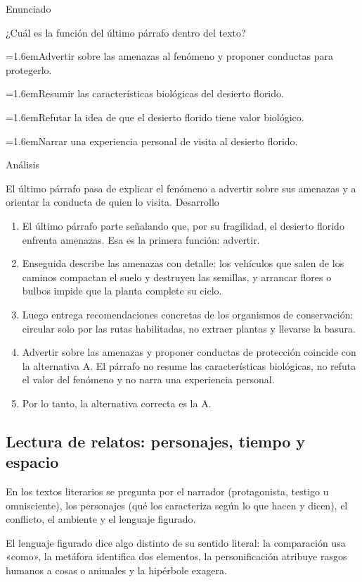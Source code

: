 \documentclass[10pt,a4paper,twocolumn]{article}
\newcommand{\alternativa}[2]{\par\noindent\hangindent=1.6em\hangafter=1\makebox[1.6em][l]{\tecla{#1}}#2\par}
\newcommand{\clave}[1]{\par\smallskip{\sffamily\footnotesize\color{esmeralda} Clave \teclaok{#1}}\par}
\begin{document}
\begin{ejemplo}
{\sffamily\footnotesize\color{zinc500} Enunciado}\par
¿Cuál es la función del último párrafo dentro del texto?
\alternativa{A}{Advertir sobre las amenazas al fenómeno y proponer conductas para protegerlo.}
\alternativa{B}{Resumir las características biológicas del desierto florido.}
\alternativa{C}{Refutar la idea de que el desierto florido tiene valor biológico.}
\alternativa{D}{Narrar una experiencia personal de visita al desierto florido.}
\clave{A}
{\sffamily\footnotesize\color{zinc500} Análisis}\par El último párrafo pasa de explicar el fenómeno a advertir sobre sus amenazas y a orientar la conducta de quien lo visita.
{\sffamily\footnotesize\color{zinc500} Desarrollo}
\begin{enumerate}
  \item El último párrafo parte señalando que, por su fragilidad, el desierto florido enfrenta amenazas. Esa es la primera función: advertir.
  \item Enseguida describe las amenazas con detalle: los vehículos que salen de los caminos compactan el suelo y destruyen las semillas, y arrancar flores o bulbos impide que la planta complete su ciclo.
  \item Luego entrega recomendaciones concretas de los organismos de conservación: circular solo por las rutas habilitadas, no extraer plantas y llevarse la basura.
  \item Advertir sobre las amenazas y proponer conductas de protección coincide con la alternativa A. El párrafo no resume las características biológicas, no refuta el valor del fenómeno y no narra una experiencia personal.
  \item Por lo tanto, la alternativa correcta es la A.
\end{enumerate}
\end{ejemplo}

\subsection{Lectura de relatos: personajes, tiempo y espacio}

En los textos literarios se pregunta por el narrador (protagonista, testigo u omnisciente), los personajes (qué los caracteriza según lo que hacen y dicen), el conflicto, el ambiente y el lenguaje figurado.

El lenguaje figurado dice algo distinto de su sentido literal: la comparación usa «como», la metáfora identifica dos elementos, la personificación atribuye rasgos humanos a cosas o animales y la hipérbole exagera.
\end{document}
